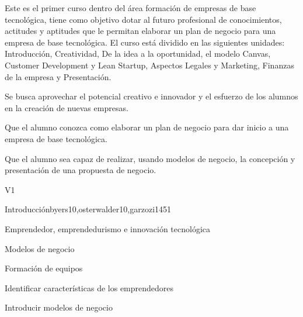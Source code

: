 \begin{syllabus}


\begin{justification}
   Este es el primer curso dentro del área formación de empresas de
   base tecnológica, tiene como objetivo dotar al futuro profesional 
   de conocimientos, actitudes y aptitudes que le
   permitan elaborar un plan de negocio para una empresa de base tecnológica.
   El curso está dividido en las siguientes unidades:
   Introducción, Creatividad, De la idea a la oportunidad, el modelo Canvas, Customer Development y Lean Startup, Aspectos Legales y Marketing, Finanzas de la empresa y Presentación.
   
   Se busca aprovechar el potencial creativo e innovador y el esfuerzo de los alumnos en la creación de nuevas empresas.
   \end{justification}
   
   \begin{goals}
   \item Que el alumno conozca como elaborar un plan de negocio para dar inicio a una empresa de base tecnológica.
   \item Que el alumno sea capaz de realizar, usando modelos de negocio, la concepción y presentación de una propuesta de negocio.
   \end{goals}
   
   \begin{outcomes}{V1}
      \item {}
      \item {}
      \item {}
   \end{outcomes}
   
   \begin{unit}{Introducción}{}{byers10,osterwalder10,garzozi14}{5}{1}
   \begin{topics}
         \item Emprendedor, emprendedurismo e innovación tecnológica
         \item Modelos de negocio
         \item Formación de equipos
      \end{topics}
   
      \begin{learningoutcomes}
         \item Identificar características de los emprendedores
         \item Introducir modelos de negocio 
      \end{learningoutcomes}
   \end{unit}
   

\end{syllabus}
